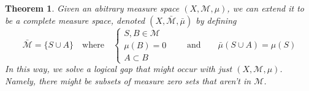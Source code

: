 \documentclass[12pt]{article}
\theoremstyle{plain}
\newtheorem{thm}{Theorem}[subsection]
\theoremstyle{definition}
\theoremstyle{remark}
\begin{document}
\begin{thm}
Given an abitrary measure space $(X,\mathscr{M},\mu)$, we can extend it
to be a \emph{complete} measure space, denoted
$(X,\bar{\mathscr{M}},\bar{\mu})$ by defining
\[
    \bar{\mathscr{M}} = \{S\cup A \} 
    \quad \text{where} \quad 
    \left\{
        \begin{array}{l}
        S, B\in\mathscr{M} \\
        \mu(B) = 0 \\ 
        A \subset B 
    \end{array}
    \right.
    \qquad \text{and} \qquad
    \bar{\mu}(S\cup A) = \mu(S)
\]
In this way, we solve a logical gap that might occur with just
$(X,\mathscr{M},\mu)$. Namely, there might be subsets of measure zero
sets that aren't in $\mathscr{M}$. 
\end{thm}
\end{document}
